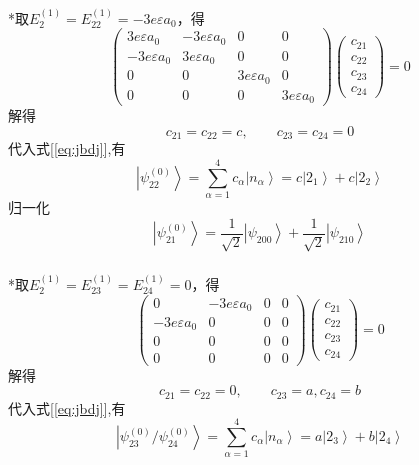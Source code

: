 \begin{frame}
  \frametitle{}
  *取$E^{(1)}_2=E^{(1)}_{22} = -3e\varepsilon a_0 $，得
  \begin{equation*}
    \begin{pmatrix}3e\varepsilon a_0 & -3e\varepsilon a_0 & 0 & 0 \\
      -3e\varepsilon a_0 & 3e\varepsilon a_0 & 0 & 0 \\
      0 & 0 & 3e\varepsilon a_0 & 0 \\
      0 & 0 & 0 & 3e\varepsilon a_0 \end{pmatrix}
      \begin{pmatrix}c_{2 1} \\c_{2 2} \\ c_{2 3} \\c_{2 4} \end{pmatrix} =0
  \end{equation*}
  解得 
  \[ c_{2 1} = c_{2 2} =c, \qquad c_{2 3} = c_{2 4} =0 \]
  代入式[\ref{eq:jbdj}],有
  \begin{equation*}
    \left\vert \psi ^{(0)}_{22} \right\rangle = \sum_{\alpha=1}^4
    c_\alpha \left\vert n_\alpha \right\rangle = c \left\vert 2_1 \right\rangle
    +c \left\vert 2_2 \right\rangle \end{equation*}
    归一化
    \begin{equation*}
      \left\vert \psi ^{(0)}_{21} \right\rangle = \frac{1}{\sqrt{2} } \left\vert \psi _{200} \right\rangle
      +\frac{1}{\sqrt{2} } \left\vert\psi _{210} \right\rangle \end{equation*}
\end{frame}  

\begin{frame}
  \frametitle{}
  *取$E^{(1)}_2=E^{(1)}_{23} = E^{(1)}_{24}  = 0 $，得
  \begin{equation*}
    \begin{pmatrix}0 & -3e\varepsilon a_0 & 0 & 0 \\
      -3e\varepsilon a_0 & 0 & 0 & 0 \\
      0 & 0 & 0 & 0 \\
      0 & 0 & 0 & 0 \end{pmatrix}
      \begin{pmatrix}c_{2 1} \\c_{2 2} \\ c_{2 3} \\c_{2 4} \end{pmatrix} =0
  \end{equation*}
  解得 
  \[ c_{2 1} = c_{2 2} =0, \qquad c_{2 3} =a, c_{2 4} =b \]
  代入式[\ref{eq:jbdj}],有
  \begin{equation*}
    \left\vert \psi ^{(0)}_{23}/\psi ^{(0)}_{24} \right\rangle = \sum_{\alpha=1}^4
    c_\alpha \left\vert n_\alpha \right\rangle = a \left\vert 2_3 \right\rangle
    +b \left\vert 2_4 \right\rangle \end{equation*}
\end{frame} 

